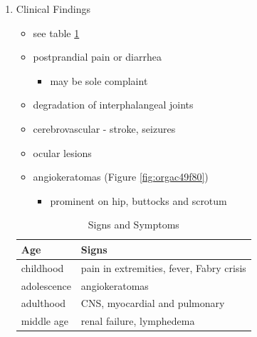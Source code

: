 \documentclass{scrartcl}
\begin{document}
\begin{enumerate}
\item Clinical Findings
\label{sec:org9d5adf7}
\begin{itemize}
\item see table \ref{tab:org3d177fb}
\item postprandial pain or diarrhea
\begin{itemize}
\item may be sole complaint
\end{itemize}
\item degradation of interphalangeal joints
\item cerebrovascular - stroke, seizures
\item ocular lesions
\item angiokeratomas (Figure \ref{fig:orgac49f80})
\begin{itemize}
\item prominent on hip, buttocks and scrotum
\end{itemize}
\end{itemize}

\begin{table}[htbp]
\caption{\label{tab:org3d177fb}
Signs and Symptoms}
\centering
\begin{tabular}{ll}
Age & Signs\\
\hline
childhood & pain in extremities, fever, Fabry crisis \footnotemark\\
adolescence & angiokeratomas\\
adulthood & CNS, myocardial and pulmonary\\
middle age & renal failure, lymphedema\\
\end{tabular}
\end{table}


\end{enumerate}
\end{document}
